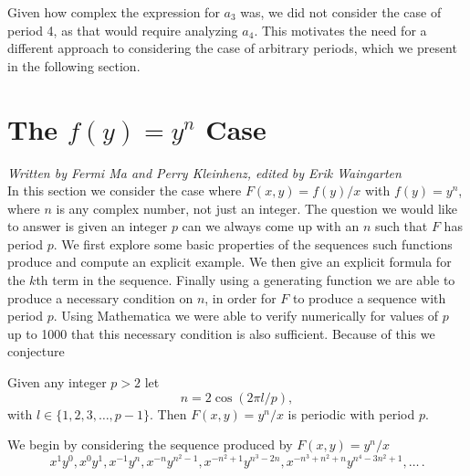 \documentclass[12pt]{article}
\begin{document}
Given how complex the expression for $a_3$ was, we did not consider the case of period 4, as that would require analyzing $a_4$. This motivates the need for a different approach to considering the case of arbitrary periods, which we present in the following section.

\section{The $f(y) = y^n$ Case}
\label{general case}

\emph{Written by Fermi Ma and Perry Kleinhenz, edited by Erik Waingarten}\\

In this section we consider the case where $F(x,y) = f(y)/x$ with $f(y) = y^n$, where $n$ is any complex number, not just an integer. The question we would like to answer is given an integer $p$ can we always come up with an $n$ such that $F$ has period $p$. We first explore some basic properties of the sequences such functions produce and compute an explicit example. We then give an explicit formula for the $k$th term in the sequence. Finally using a generating function we are able to produce a necessary condition on $n$, in order for $F$ to produce a sequence with period $p$. Using Mathematica we were able to verify numerically for values of $p$ up to 1000 that this necessary condition is also sufficient. Because of this we conjecture 
\begin{conjecture}
\label{cos}
Given any integer $p>2$ let 
\begin{equation*}
n = 2 \cos(2 \pi l/p),
\end{equation*}
with $l \in \{1,2,3, \ldots, p-1 \}$. Then $F(x,y) = y^n/x$ is periodic with period $p$.
\end{conjecture}

We begin by considering the sequence produced by $F(x,y) = y^n/x$ 
\begin{equation}
\label{exponents}
x^1y^0, x^0y^1, x^{-1}y^{n}, x^{-n}y^{n^2-1}, x^{-n^2+1}y^{n^3-2n},x^{-n^3+n^2+n}y^{n^4-3n^2+1}, \dots \,.
\end{equation}
\end{document}

